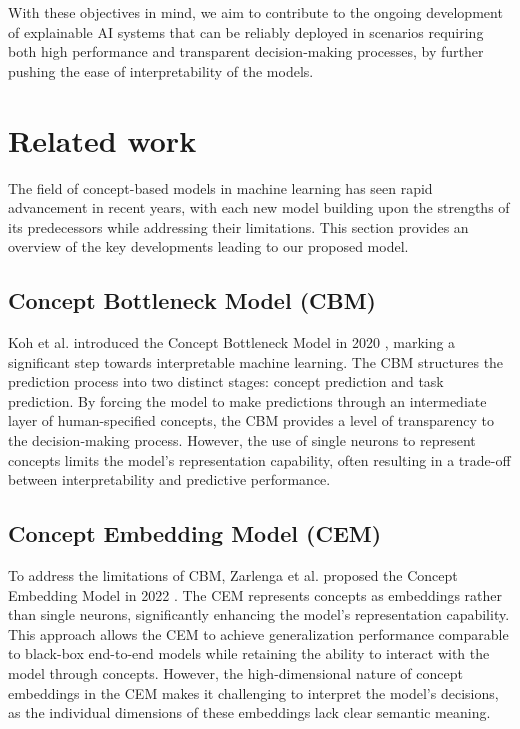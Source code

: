 \documentclass[sigconf, nonacm]{acmart}
\begin{document}
With these objectives in mind, we aim to contribute to the ongoing development of explainable AI systems that can be reliably deployed in scenarios requiring both high performance and transparent decision-making processes, by further pushing the ease of interpretability of the models. \vspace{8pt}

\section{Related work}
\vspace{2pt}
The field of concept-based models in machine learning has seen rapid advancement in recent years, with each new model building upon the strengths of its predecessors while addressing their limitations. This section provides an overview of the key developments leading to our proposed model. \vspace{6pt}

\subsection{Concept Bottleneck Model (CBM)}
\vspace{2pt}
Koh et al. introduced the Concept Bottleneck Model in 2020 \cite{koh2020concept}, marking a significant step towards interpretable machine learning. The CBM structures the prediction process into two distinct stages: concept prediction and task prediction. By forcing the model to make predictions through an intermediate layer of human-specified concepts, the CBM provides a level of transparency to the decision-making process. However, the use of single neurons to represent concepts limits the model's representation capability, often resulting in a trade-off between interpretability and predictive performance. \vspace{6pt}

\subsection{Concept Embedding Model (CEM)}
\vspace{2pt}
To address the limitations of CBM, Zarlenga et al. proposed the Concept Embedding Model in 2022 \cite{espinosa2022concept}. The CEM represents concepts as embeddings rather than single neurons, significantly enhancing the model's representation capability. This approach allows the CEM to achieve generalization performance comparable to black-box end-to-end models while retaining the ability to interact with the model through concepts. However, the high-dimensional nature of concept embeddings in the CEM makes it challenging to interpret the model's decisions, as the individual dimensions of these embeddings lack clear semantic meaning. \vspace{6pt}
\end{document}
